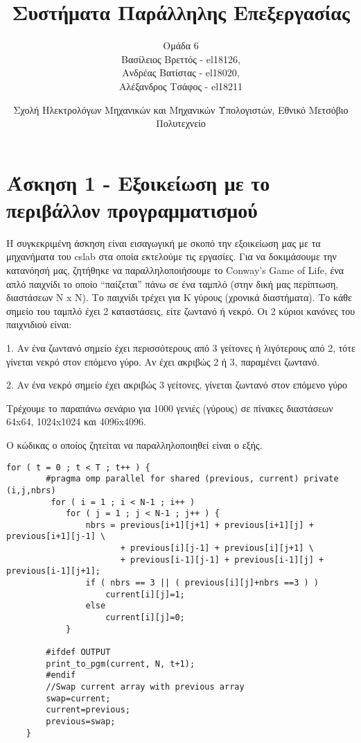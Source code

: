 \documentclass[letterpaper,12pt]{article}
\begin{document}
\title{Συστήματα Παράλληλης Επεξεργασίας}
\author{Ομάδα 6 \\
Βασίλειος Βρεττός - el18126, \\
Ανδρέας Βατίστας - el18020, \\
Αλέξανδρος Τσάφος - el18211\\}
\date{Σχολή Ηλεκτρολόγων Μηχανικών και Μηχανικών Υπολογιστών, Εθνικό Μετσόβιο Πολυτεχνείο}
\maketitle




\section{Άσκηση 1 - Εξοικείωση με το περιβάλλον προγραμματισμού}
Η συγκεκριμένη άσκηση είναι εισαγωγική με σκοπό την εξοικείωση μας με τα μηχανήματα του cslab στα οποία εκτελούμε τις εργασίες. Για να δοκιμάσουμε την κατανόησή μας, ζητήθηκε να παραλληλοποιήσουμε το Conway’s Game of Life, ένα απλό παιχνίδι το οποίο “παίζεται” πάνω σε ένα ταμπλό (στην δική μας περίπτωση, διαστάσεων N x N). Το παιχνίδι τρέχει για Κ γύρους (χρονικά διαστήματα). Το κάθε σημείο του ταμπλό έχει 2 καταστάσεις, είτε ζωντανό ή νεκρό. Οι 2 κύριοι κανόνες του παιχνιδιού είναι: \newline

1.	Αν ένα ζωντανό σημείο έχει περισσότερους από 3 γείτονες ή λιγότερους από 2, τότε γίνεται νεκρό στον επόμενο γύρο. Αν έχει ακριβώς 2 ή 3, παραμένει ζωντανό. 

2.	Αν ένα νεκρό σημείο έχει ακριβώς 3 γείτονες, γίνεται ζωντανό στον επόμενο γύρο \newline

Τρέχουμε το παραπάνω σενάριο για 1000 γενιές (γύρους) σε πίνακες διαστάσεων 64x64, 1024x1024 και 4096x4096. \newline

Ο κώδικας ο οποίος ζητείται να παραλληλοποιηθεί είναι ο εξής.


\begin{lstlisting}
for ( t = 0 ; t < T ; t++ ) {
        #pragma omp parallel for shared (previous, current) private (i,j,nbrs)
         for ( i = 1 ; i < N-1 ; i++ )
            for ( j = 1 ; j < N-1 ; j++ ) {
                nbrs = previous[i+1][j+1] + previous[i+1][j] + previous[i+1][j-1] \
                       + previous[i][j-1] + previous[i][j+1] \
                       + previous[i-1][j-1] + previous[i-1][j] + previous[i-1][j+1];
                if ( nbrs == 3 || ( previous[i][j]+nbrs ==3 ) )
                    current[i][j]=1;
                else
                    current[i][j]=0;
            }

        #ifdef OUTPUT
        print_to_pgm(current, N, t+1);
        #endif
        //Swap current array with previous array
        swap=current;
        current=previous;
        previous=swap;
    }
\end{lstlisting}
\end{document}
